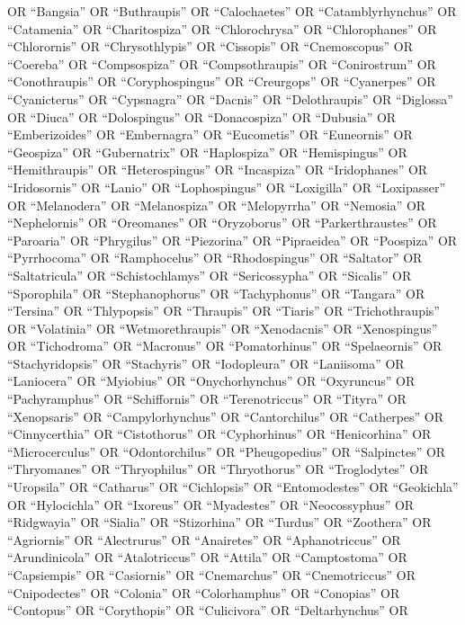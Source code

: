 \documentclass[
  number,
  review,
  onecolumn]{elsarticle}
\begin{document}
OR ``Bangsia'' OR ``Buthraupis'' OR ``Calochaetes'' OR
``Catamblyrhynchus'' OR ``Catamenia'' OR ``Charitospiza'' OR
``Chlorochrysa'' OR ``Chlorophanes'' OR ``Chlorornis'' OR
``Chrysothlypis'' OR ``Cissopis'' OR ``Cnemoscopus'' OR ``Coereba'' OR
``Compsospiza'' OR ``Compsothraupis'' OR ``Conirostrum'' OR
``Conothraupis'' OR ``Coryphospingus'' OR ``Creurgops'' OR ``Cyanerpes''
OR ``Cyanicterus'' OR ``Cypsnagra'' OR ``Dacnis'' OR ``Delothraupis'' OR
``Diglossa'' OR ``Diuca'' OR ``Dolospingus'' OR ``Donacospiza'' OR
``Dubusia'' OR ``Emberizoides'' OR ``Embernagra'' OR ``Eucometis'' OR
``Euneornis'' OR ``Geospiza'' OR ``Gubernatrix'' OR ``Haplospiza'' OR
``Hemispingus'' OR ``Hemithraupis'' OR ``Heterospingus'' OR
``Incaspiza'' OR ``Iridophanes'' OR ``Iridosornis'' OR ``Lanio'' OR
``Lophospingus'' OR ``Loxigilla'' OR ``Loxipasser'' OR ``Melanodera'' OR
``Melanospiza'' OR ``Melopyrrha'' OR ``Nemosia'' OR ``Nephelornis'' OR
``Oreomanes'' OR ``Oryzoborus'' OR ``Parkerthraustes'' OR ``Paroaria''
OR ``Phrygilus'' OR ``Piezorina'' OR ``Pipraeidea'' OR ``Poospiza'' OR
``Pyrrhocoma'' OR ``Ramphocelus'' OR ``Rhodospingus'' OR ``Saltator'' OR
``Saltatricula'' OR ``Schistochlamys'' OR ``Sericossypha'' OR
``Sicalis'' OR ``Sporophila'' OR ``Stephanophorus'' OR ``Tachyphonus''
OR ``Tangara'' OR ``Tersina'' OR ``Thlypopsis'' OR ``Thraupis'' OR
``Tiaris'' OR ``Trichothraupis'' OR ``Volatinia'' OR ``Wetmorethraupis''
OR ``Xenodacnis'' OR ``Xenospingus'' OR ``Tichodroma'' OR ``Macronus''
OR ``Pomatorhinus'' OR ``Spelaeornis'' OR ``Stachyridopsis'' OR
``Stachyris'' OR ``Iodopleura'' OR ``Laniisoma'' OR ``Laniocera'' OR
``Myiobius'' OR ``Onychorhynchus'' OR ``Oxyruncus'' OR ``Pachyramphus''
OR ``Schiffornis'' OR ``Terenotriccus'' OR ``Tityra'' OR ``Xenopsaris''
OR ``Campylorhynchus'' OR ``Cantorchilus'' OR ``Catherpes'' OR
``Cinnycerthia'' OR ``Cistothorus'' OR ``Cyphorhinus'' OR
``Henicorhina'' OR ``Microcerculus'' OR ``Odontorchilus'' OR
``Pheugopedius'' OR ``Salpinctes'' OR ``Thryomanes'' OR ``Thryophilus''
OR ``Thryothorus'' OR ``Troglodytes'' OR ``Uropsila'' OR ``Catharus'' OR
``Cichlopsis'' OR ``Entomodestes'' OR ``Geokichla'' OR ``Hylocichla'' OR
``Ixoreus'' OR ``Myadestes'' OR ``Neocossyphus'' OR ``Ridgwayia'' OR
``Sialia'' OR ``Stizorhina'' OR ``Turdus'' OR ``Zoothera'' OR
``Agriornis'' OR ``Alectrurus'' OR ``Anairetes'' OR ``Aphanotriccus'' OR
``Arundinicola'' OR ``Atalotriccus'' OR ``Attila'' OR ``Camptostoma'' OR
``Capsiempis'' OR ``Casiornis'' OR ``Cnemarchus'' OR ``Cnemotriccus'' OR
``Cnipodectes'' OR ``Colonia'' OR ``Colorhamphus'' OR ``Conopias'' OR
``Contopus'' OR ``Corythopis'' OR ``Culicivora'' OR ``Deltarhynchus'' OR
\end{document}
